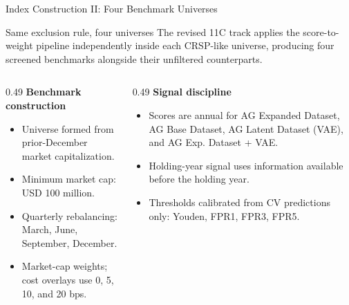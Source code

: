 \documentclass[10pt]{beamer}\usepackage[]{graphicx}\usepackage[table]{xcolor}
\begin{document}
\begin{frame}{Index Construction II: Four Benchmark Universes}
\small

\begin{alertblock}{Same exclusion rule, four universes}
\scriptsize
The revised 11C track applies the score-to-weight pipeline independently inside each CRSP-like universe, producing four screened benchmarks alongside their unfiltered counterparts.
\end{alertblock}

\vspace{0.6em}

\begin{center}
\end{center}

\vspace{0.4em}

\begin{columns}[t]
\begin{column}{0.49\textwidth}
\textbf{Benchmark construction}
\scriptsize
\begin{itemize}
  \item Universe formed from prior-December market capitalization.
  \item Minimum market cap: USD 100 million.
  \item Quarterly rebalancing: March, June, September, December.
  \item Market-cap weights; cost overlays use 0, 5, 10, and 20 bps.
\end{itemize}
\end{column}
\begin{column}{0.49\textwidth}
\textbf{Signal discipline}
\scriptsize
\begin{itemize}
  \item Scores are annual for AG Expanded Dataset, AG Base Dataset, AG Latent Dataset (VAE), and AG Exp. Dataset + VAE.
  \item Holding-year signal uses information available before the holding year.
  \item Thresholds calibrated from CV predictions only: Youden, FPR1, FPR3, FPR5.
\end{itemize}
\end{column}
\end{columns}


\end{frame}
\end{document}
